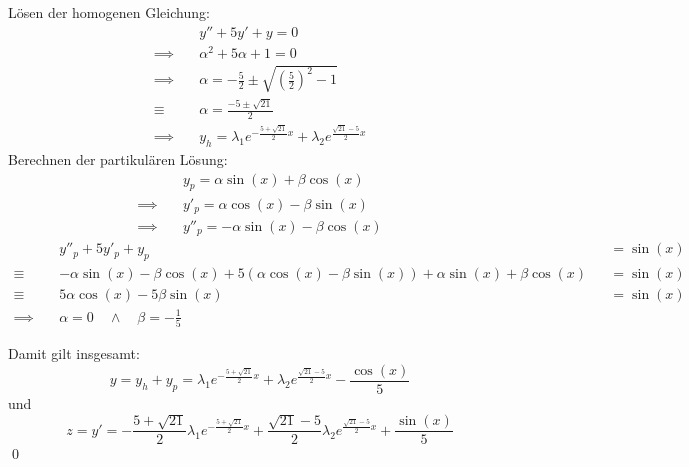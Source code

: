 \documentclass[answers]{exam}
\begin{document}
\begin{questions}
\begin{solution}
        Lösen der homogenen Gleichung:
        $$
            \begin{aligned}
                               & y'' + 5y' + y = 0                                                                     \\
                \implies \quad & \alpha^2 + 5\alpha + 1 = 0                                                            \\
                \implies \quad & \alpha = -\frac{5}{2} \pm \sqrt{\left(\frac{5}{2}\right)^2 - 1}                       \\
                \equiv \quad   & \alpha = \frac{-5\pm \sqrt{21}}{2}                                                    \\
                \implies \quad & y_h = \lambda_1 e^{-\frac{5 + \sqrt{21}}{2}x} + \lambda_2 e^{\frac{\sqrt{21} -5}{2}x}
            \end{aligned}
        $$
        Berechnen der partikulären Lösung:
        $$
            \begin{aligned}
                               & y_p = \alpha\sin(x) + \beta\cos(x)     \\
                \implies \quad & y'_p = \alpha\cos(x) - \beta\sin(x)    \\
                \implies \quad & y''_p  = -\alpha\sin(x) - \beta\cos(x)
            \end{aligned}
        $$
        $$
            \begin{aligned}
                               & y''_p + 5y'_p + y_p                                                                            &  & =\sin(x) \\
                \equiv \quad   & -\alpha\sin(x) - \beta\cos(x) + 5(\alpha\cos(x) - \beta\sin(x)) + \alpha\sin(x) + \beta\cos(x) &  & =\sin(x) \\
                \equiv \quad   & 5\alpha\cos(x) - 5\beta\sin(x)                                                                 &  & =\sin(x) \\
                \implies \quad & \alpha = 0 \quad \land \quad \beta = -\frac{1}{5}
            \end{aligned}
        $$

        Damit gilt insgesamt:
        $$
            y = y_h + y_p = \lambda_1 e^{-\frac{5 + \sqrt{21}}{2}x} + \lambda_2 e^{\frac{\sqrt{21} -5}{2}x} - \frac{\cos(x)}{5}
        $$
        und
        $$
            z = y' = -\frac{5 + \sqrt{21}}{2}\lambda_1e^{-\frac{5 + \sqrt{21}}{2}x} + \frac{\sqrt{21} -5}{2}\lambda_2 e^{\frac{\sqrt{21} -5}{2}x} + \frac{\sin(x)}{5}
        $$\qed
    \end{solution}


\end{questions}
\end{document}
